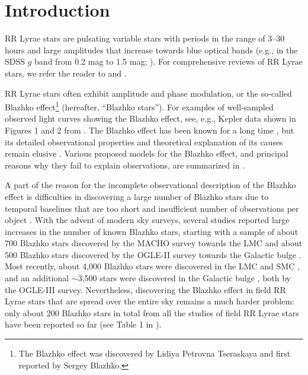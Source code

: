 \section{Introduction\label{sec:intro}}

RR Lyrae stars are pulsating variable stars with periods in the range of 3--30 hours and large amplitudes
that increase towards blue optical bands (e.g., in the SDSS $g$ band from 0.2 mag to 1.5 mag;
\citealt{2010ApJ...708..717S}). For comprehensive reviews of RR Lyrae stars, we refer the reader to \cite{1995CAS....27.....S} and \cite{2009Ap&SS.320..261C}.

RR Lyrae stars often exhibit amplitude and phase modulation, or the so-called Blazhko effect\footnote{The Blazhko effect was discovered by Lidiya Petrovna Tseraskaya and first reported by Sergey Blazhko.} (hereafter,
``Blazhko stars''). For examples of well-sampled observed light curves showing the Blazhko effect, see,  e.g., Kepler
data shown in Figures 1 and 2 from \cite{2010MNRAS.409.1585B}. The Blazhko effect has been known for a long time \citep{1907AN....175..325B}, but its detailed observational properties and theoretical explanation of its causes remain elusive
\citep{2008JPhCS.118a2060K,2009AIPC.1170..261K,2014IAUS..301..241S}.
Various proposed models for the Blazhko effect, and principal reasons why they fail to explain observations, are summarized in \cite{2016CoKon.105...61K}. 

A part of the reason for the incomplete observational description of the Blazhko effect is difficulties in discovering a large number 
of Blazhko stars due to temporal baselines that are too short and insufficient number of observations per object
\citep{2016CoKon.105...61K,2022ApJS..258....4H}. With the advent of modern sky surveys, several studies
reported large increases in the number of known Blazhko stars, starting with a sample of about 700 Blazhko
stars discovered by the MACHO survey towards the LMC \citep{2003ApJ...598..597A} and about 500 Blazhko stars
discovered by the OGLE-II survey towards the Galactic bulge \citep{2003AcA....53..307M}. 
Most recently,  about 4,000 Blazhko stars were discovered in the LMC and SMC 
\citep{2009AcA....59....1S, 2010AcA....60..165S}, and an additional $\sim$3,500 stars were discovered in the
Galactic bulge \citep{2011AcA....61....1S}, both by the OGLE-III survey. Nevertheless, discovering the Blazhko
effect in field RR Lyrae stars that are spread over the entire sky remains a much harder problem: only about
200 Blazhko stars in total from all the studies of field RR Lyrae stars have been reported so far (see Table 1
in \citealt{2016CoKon.105...61K}). 

